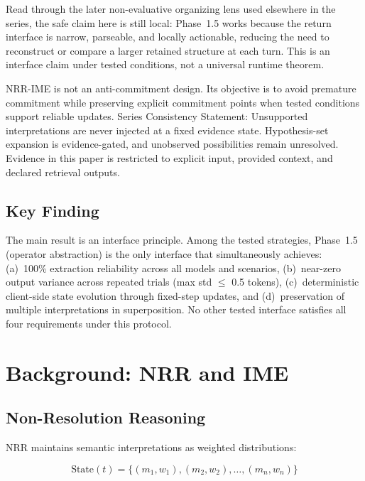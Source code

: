 \documentclass[11pt,a4paper]{article}
\begin{document}
Read through the later non-evaluative organizing lens used elsewhere in the series,
the safe claim here is still local: Phase~1.5 works because the return interface is
narrow, parseable, and locally actionable, reducing the need to reconstruct or compare
a larger retained structure at each turn. This is an interface claim under tested
conditions, not a universal runtime theorem.

NRR-IME is not an anti-commitment design. Its objective is to avoid premature commitment while preserving explicit commitment points when tested conditions support reliable updates.
Series Consistency Statement: Unsupported interpretations are never injected at a fixed evidence state. Hypothesis-set expansion is evidence-gated, and unobserved possibilities remain unresolved. Evidence in this paper is restricted to explicit input, provided context, and declared retrieval outputs.

\subsection{Key Finding}

The main result is an interface principle. Among the tested strategies,
Phase~1.5 (operator abstraction) is the only interface that simultaneously
achieves: (a)~100\% extraction reliability across all models and scenarios,
(b)~near-zero output variance across repeated trials (max std $\leq$ 0.5
tokens), (c)~deterministic client-side state evolution through fixed-step
updates, and (d)~preservation of multiple interpretations in superposition.
No other tested interface satisfies all four requirements under this protocol.

\section{Background: NRR and IME}
\label{sec:background}

\subsection{Non-Resolution Reasoning}

NRR maintains semantic interpretations as weighted distributions:

\begin{equation}
\text{State}(t) = \{(m_1, w_1), (m_2, w_2), \ldots, (m_n, w_n)\}
\end{equation}
\end{document}
